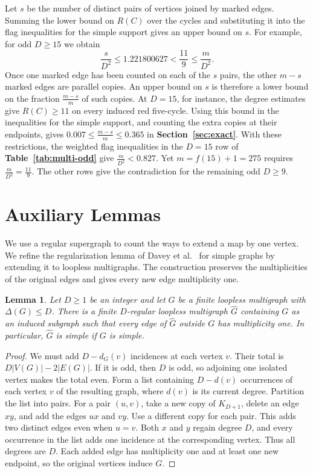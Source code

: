 \documentclass[preprint,11pt,numbers]{elsarticle-arxiv}
\numberwithin{equation}{section}
\newtheorem{lemma}[theorem]{Lemma}
\theoremstyle{definition}
\begin{document}
Let $s$ be the number of distinct pairs of vertices joined by
marked edges. Summing the lower bound on $R(C)$ over the cycles
and substituting it into the flag inequalities for the simple
support gives an upper bound on $s$. For example, for odd
$D\geq15$ we obtain
\[
  \frac{s}{D^2}\leq 1.221800627
  <\frac{11}{9}\leq\frac{m}{D^2}.
\]
Once one marked edge has been counted on each of the $s$ pairs,
the other $m-s$ marked edges are parallel copies. An upper bound
on $s$ is therefore a lower bound on the fraction $\frac{m-s}{m}$
of such copies. At $D=15$, for instance, the degree estimates give
$R(C)\geq11$ on every induced red five-cycle. Using this bound in the
inequalities for the simple support, and counting the extra copies at
their endpoints, gives $0.007\leq\frac{m-s}{m}\leq0.365$
in \textbf{Section~\ref{sec:exact}}.
With these restrictions, the weighted flag inequalities in the
$D=15$ row of \textbf{Table~\ref{tab:multi-odd}} give
$\frac{m}{D^2}<0.827$. Yet $m=f(15)+1=275$ requires
$\frac{m}{D^2}=\frac{11}{9}$. The other rows give the contradiction
for the remaining odd $D\geq9$.
\section{Auxiliary Lemmas}\label{sec:auxiliary}

We use a regular supergraph to count the ways to extend a map by one
vertex. We refine the regularization lemma of Davey et
al.~\cite{DaveyEtAlStrong2026} for simple graphs by extending it to
loopless multigraphs. The construction preserves the multiplicities
of the original edges and gives every new edge multiplicity one.

\begin{lemma}\label{lem:regularization}
Let $D\geq1$ be an integer and let $G$ be a finite loopless multigraph
with $\Delta(G)\leq D$. There is a finite $D$-regular loopless multigraph
$\widehat G$ containing $G$ as an induced subgraph such that every
edge of $\widehat G$ outside $G$ has multiplicity one. In particular, $\widehat G$ is simple
if $G$ is simple.
\end{lemma}

\begin{proof}
We must add $D-d_G(v)$ incidences at each vertex $v$. Their total
is $D|V(G)|-2|E(G)|$. If it is odd, then $D$ is odd, so adjoining one
isolated vertex makes the total even. Form a list containing $D-d(v)$
occurrences of each vertex $v$ of the resulting graph, where $d(v)$ is
its current degree. Partition the list into pairs. For a pair $(u,v)$,
take a new copy of $K_{D+1}$, delete an edge $xy$, and add the edges
$ux$ and $vy$. Use a different copy for each pair. This adds two
distinct edges even when $u=v$. Both $x$ and $y$ regain degree $D$,
and every occurrence in the list adds one incidence at the
corresponding vertex. Thus all degrees are $D$. Each added edge has
multiplicity one and at least one new endpoint, so the original
vertices induce $G$.
\end{proof}
\end{document}
